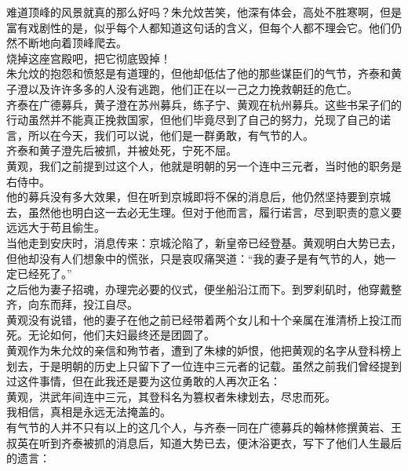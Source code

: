 \begin{multicols}{\theparacolNo}
难道顶峰的风景就真的那么好吗？朱允炆苦笑，他深有体会，高处不胜寒啊，但是富有戏剧性的是，似乎每个人都知道这句话的含义，但每个人都不理会它。他们仍然不断地向着顶峰爬去。\\

烧掉这座宫殿吧，把它彻底毁掉！\\

朱允炆的抱怨和愤怒是有道理的，但他却低估了他的那些谋臣们的气节，齐泰和黄子澄以及许许多多的人没有逃跑，他们正在以一己之力挽救朝廷的危亡。\\

齐泰在广德募兵，黄子澄在苏州募兵，练子宁、黄观在杭州募兵。这些书呆子们的行动虽然并不能真正挽救国家，但他们毕竟尽到了自己的努力，兑现了自己的诺言，所以在今天，我们可以说，他们是一群勇敢，有气节的人。\\

齐泰和黄子澄先后被抓，并被处死，宁死不屈。\\

黄观，我们之前提到过这个人，他就是明朝的另一个连中三元者，当时他的职务是右侍中。\\

他的募兵没有多大效果，但在听到京城即将不保的消息后，他仍然坚持要到京城去，虽然他也明白这一去必无生理。但对于他而言，履行诺言，尽到职责的意义要远远大于苟且偷生。\\

当他走到安庆时，消息传来：京城沦陷了，新皇帝已经登基。黄观明白大势已去，但他却没有人们想象中的慌张，只是哀叹痛哭道：“我的妻子是有气节的人，她一定已经死了。”\\

之后他为妻子招魂，办理完必要的仪式，便坐船沿江而下。到罗刹矶时，他穿戴整齐，向东而拜，投江自尽。\\

黄观没有说错，他的妻子在他之前已经带着两个女儿和十个亲属在淮清桥上投江而死。无论如何，他们夫妇最终还是团圆了。\\

黄观作为朱允炆的亲信和殉节者，遭到了朱棣的妒恨，他把黄观的名字从登科榜上划去，于是明朝的历史上只留下了一位连中三元者的记载。虽然之前我们曾经提到过这件事情，但在此我还是要为这位勇敢的人再次正名：\\

黄观，洪武年间连中三元，其登科名为篡权者朱棣划去，尽忠而死。\\

我相信，真相是永远无法掩盖的。\\

有气节的人并不只有以上的这几个人，与齐泰一同在广德募兵的翰林修撰黄岩、王叔英在听到齐泰被抓的消息后，知道大势已去，便沐浴更衣，写下了他们人生最后的遗言：\\


\end{multicols}
